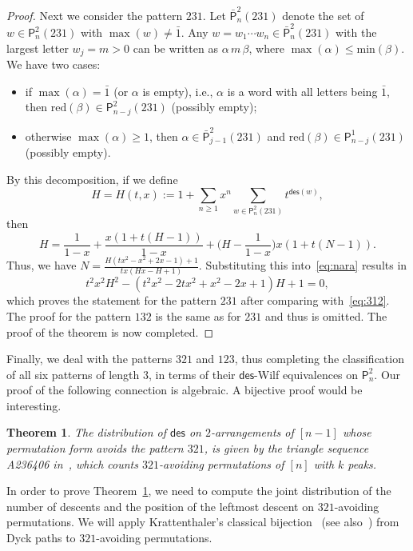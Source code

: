 \documentclass[12pt]{amsart}
\numberwithin{equation}{section}
\theoremstyle{plain}
\newtheorem{theorem}{Theorem}[section]
\theoremstyle{definition}
\renewcommand\P{\mathsf{P}}
\def\reduction{\mathrm{red}}
\def\max{\mathrm{max}}
\def\min{\mathrm{min}}
\def\des{\mathsf{des}}
\def\max{\operatorname{max}}
\def\neg#1{{{{\bar#1}}}}
\begin{document}
\begin{proof}
Next we consider the pattern $231$. Let $\bar{\P}_n^2(231)$ denote the set of $w\in\P_n^2(231)$ with $\max(w)\neq\neg1$. Any $w=w_1\cdots w_n\in\bar{\P}_n^2(231)$ with the largest letter $w_j=m>0$ can be written as $\alpha\,m\,\beta$, where $\max(\alpha)\leq \min(\beta)$. We have two cases:
\begin{itemize}
\item if $\max(\alpha)=\neg1$ (or $\alpha$ is empty), i.e., $\alpha$ is a word with all letters being $\neg1$, then $\reduction(\beta)\in\P_{n-j}^2(231)$ (possibly empty);
\item otherwise $\max(\alpha)\ge 1$, then $\alpha\in\bar{\P}_{j-1}^2(231)$ and $\reduction(\beta)\in\P_{n-j}^1(231)$ (possibly empty). 
\end{itemize}
By this decomposition, if we define 
$$
H=H(t,x):=1+\sum_{n\geq1}x^n\sum_{w\in\P_n^2(231)}t^{\des(w)},
$$
then 
$$
H=\frac{1}{1-x}+\frac{x(1+t(H-1))}{1-x}+\biggl(H-\frac{1}{1-x}\biggr)x(1+t(N-1)). 
$$
Thus, we have
$N=\frac{H(tx^2-x^2+2x-1)+1}{tx(Hx-H+1)}$. Substituting this into~\eqref{eq:nara} results in
$$
t^2x^2H^2-(t^2x^2-2tx^2+x^2-2x+1)H+1=0,
$$
which proves the statement for the pattern $231$ after comparing with~\eqref{eq:312}. The proof for the pattern $132$ is the same as for $231$ and thus is omitted. The proof of the theorem is now completed. 
\end{proof}


Finally, we deal with the patterns $321$ and $123$, thus completing the classification of all six patterns of length $3$, in terms of their $\des$-Wilf equivalences on $\P_n^2$. Our proof of the following connection is algebraic. A bijective proof would be interesting. 


\begin{theorem}\label{thm:321}
The distribution of $\des$ on $2$-arrangements of $[n-1]$ whose permutation form avoids the pattern $321$, is given by the triangle sequence A236406 in~\cite{oeis}, which counts $321$-avoiding permutations of $[n]$ with $k$ peaks.
\end{theorem}

In order to prove Theorem~\ref{thm:321}, we need to compute the joint distribution of the number of descents and the position of the leftmost descent on $321$-avoiding permutations. We will apply Krattenthaler's classical bijection~\cite{kr} (see also~\cite{eli}) from Dyck paths to $321$-avoiding permutations. 
   
\end{document}

